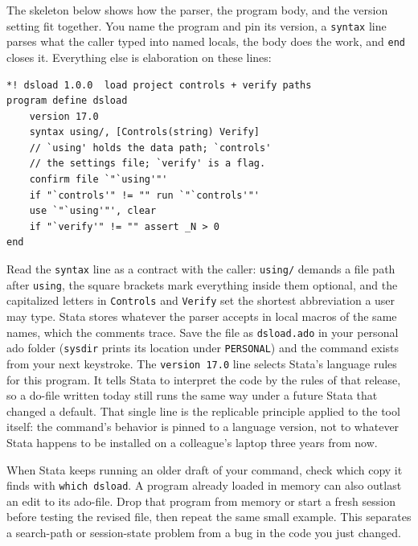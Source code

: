 \documentclass[
    a4paper,
    fontsize=10pt,
    twoside=true,
    numbers=noenddot,
]{kaobook}
\begin{document}
The skeleton below shows how the parser, the program body, and the version setting fit together. You name the program and pin its version, a \texttt{syntax} line parses what the caller typed into named locals, the body does the work, and \texttt{end} closes it. Everything else is elaboration on these lines:
\par
{\footnotesize
\begin{verbatim}
*! dsload 1.0.0  load project controls + verify paths
program define dsload
    version 17.0
    syntax using/, [Controls(string) Verify]
    // `using' holds the data path; `controls'
    // the settings file; `verify' is a flag.
    confirm file `"`using'"'
    if "`controls'" != "" run `"`controls'"'
    use `"`using'"', clear
    if "`verify'" != "" assert _N > 0
end
\end{verbatim}
}
Read the \texttt{syntax} line as a contract with the caller: \texttt{using/} demands a file path after \texttt{using}, the square brackets mark everything inside them optional, and the capitalized letters in \texttt{Controls} and \texttt{Verify} set the shortest abbreviation a user may type. Stata stores whatever the parser accepts in local macros of the same names, which the comments trace. Save the file as \texttt{dsload.ado} in your personal ado folder (\texttt{sysdir} prints its location under \texttt{PERSONAL}) and the command exists from your next keystroke.
The \texttt{version 17.0} line selects Stata's language rules for this program. It tells Stata to interpret the code by the rules of that release, so a do-file written today still runs the same way under a future Stata that changed a default. That single line is the replicable principle applied to the tool itself: the command's behavior is pinned to a language version, not to whatever Stata happens to be installed on a colleague's laptop three years from now.

When Stata keeps running an older draft of your command, check which copy it finds with \texttt{which dsload}. A program already loaded in memory can also outlast an edit to its ado-file. Drop that program from memory or start a fresh session before testing the revised file, then repeat the same small example. This separates a search-path or session-state problem from a bug in the code you just changed.
\end{document}
